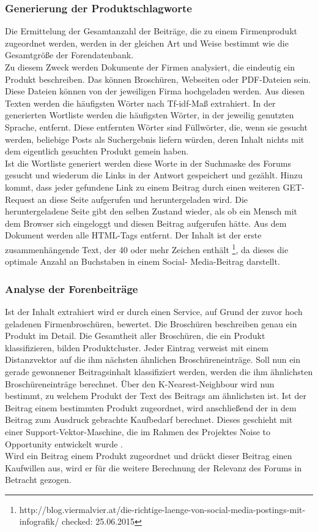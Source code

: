\subsubsection{Generierung der Produktschlagworte}
Die Ermittelung der Gesamtanzahl der Beiträge, die zu einem Firmenprodukt zugeordnet werden, werden in der gleichen Art und Weise bestimmt wie die Gesamtgröße der Forendatenbank.\\
Zu diesem Zweck werden Dokumente der Firmen analysiert, die eindeutig ein Produkt beschreiben. Das können Broschüren, Webseiten oder PDF-Dateien sein. Diese Dateien können von der jeweiligen Firma hochgeladen werden. Aus diesen Texten werden die häufigsten Wörter nach Tf-idf-Maß extrahiert. In der generierten Wortliste werden die häufigsten Wörter, in der jeweilig genutzten Sprache, entfernt. Diese entfernten Wörter sind Füllwörter, die, wenn sie gesucht werden, beliebige Posts als Suchergebnis liefern würden, deren Inhalt nichts mit dem eigentlich gesuchten Produkt gemein haben.\\
Ist die Wortliste generiert werden diese Worte in der Suchmaske des Forums gesucht und wiederum die Links in der Antwort gespeichert und gezählt. Hinzu kommt, dass jeder gefundene Link zu einem Beitrag durch einen weiteren GET-Request an diese Seite aufgerufen und heruntergeladen wird. Die heruntergeladene Seite gibt den selben Zustand wieder, als ob ein Mensch mit dem Browser sich eingeloggt und diesen Beitrag aufgerufen hätte. Aus dem Dokument werden alle HTML-Tags entfernt. Der Inhalt ist der erste zusammenhängende Text, der 40 oder mehr Zeichen enthält \footnote{http://blog.viermalvier.at/die-richtige-laenge-von-social-media-postings-mit-infografik/ checked: 25.06.2015}, da dieses die optimale Anzahl an Buchstaben in einem Social- Media-Beitrag darstellt.

\subsubsection{Analyse der Forenbeiträge}
Ist der Inhalt extrahiert wird er durch einen Service, auf Grund der zuvor hoch geladenen Firmenbroschüren, bewertet. Die Broschüren beschreiben genau ein Produkt im Detail. Die Gesamtheit aller Broschüren, die ein Produkt klassifizieren, bilden Produktcluster. Jeder Eintrag verweist mit einem Distanzvektor auf die ihm nächsten ähnlichen Broschüreneinträge. Soll nun ein gerade gewonnener Beitragsinhalt klassifiziert werden, werden die ihm ähnlichsten Broschüreneinträge berechnet. Über den K-Nearest-Neighbour wird nun bestimmt, zu welchem Produkt der Text des Beitrags am ähnlichsten ist. Ist der Beitrag einem bestimmten Produkt zugeordnet, wird anschließend der in dem Beitrag zum Ausdruck gebrachte Kaufbedarf berechnet. Dieses geschieht mit einer Support-Vektor-Maschine, die im Rahmen des Projektes Noise to Opportunity entwickelt wurde \cite{n2o}.\\
Wird ein Beitrag einem Produkt zugeordnet und drückt dieser Beitrag einen Kaufwillen aus, wird er für die weitere Berechnung der Relevanz des Forums in Betracht gezogen.

